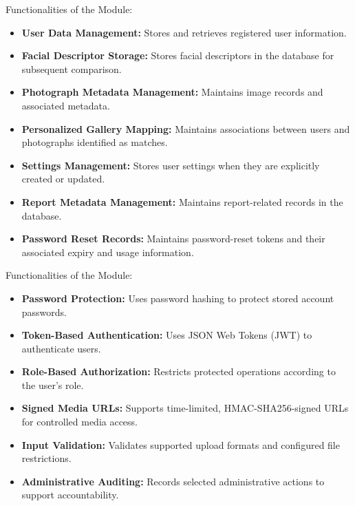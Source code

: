 
Functionalities of the Module:
\begin{itemize}
    \item \textbf{User Data Management: } \noindent Stores and retrieves registered user information.
    \item \textbf{Facial Descriptor Storage: } \noindent Stores facial descriptors in the database for subsequent comparison.
    \item \textbf{Photograph Metadata Management: } \noindent Maintains image records and associated metadata.
    \item \textbf{Personalized Gallery Mapping: } \noindent Maintains associations between users and photographs identified as matches.
    \item \textbf{Settings Management: } \noindent Stores user settings when they are explicitly created or updated.
    \item \textbf{Report Metadata Management: } \noindent Maintains report-related records in the database.
    \item \textbf{Password Reset Records: } \noindent Maintains password-reset tokens and their associated expiry and usage information.
\end{itemize}


Functionalities of the Module:
\begin{itemize}

    \item \textbf{Password Protection: } \noindent Uses password hashing to protect stored account passwords.
    \item \textbf{Token-Based Authentication: } \noindent Uses JSON Web Tokens (JWT) to authenticate users.
    \item \textbf{Role-Based Authorization: } \noindent Restricts protected operations according to the user's role.
    \item \textbf{Signed Media URLs: } \noindent Supports time-limited, HMAC-SHA256-signed URLs for controlled media access.
    \item \textbf{Input Validation: } \noindent Validates supported upload formats and configured file restrictions.
    \item \textbf{Administrative Auditing: } \noindent Records selected administrative actions to support accountability.
\end{itemize}

